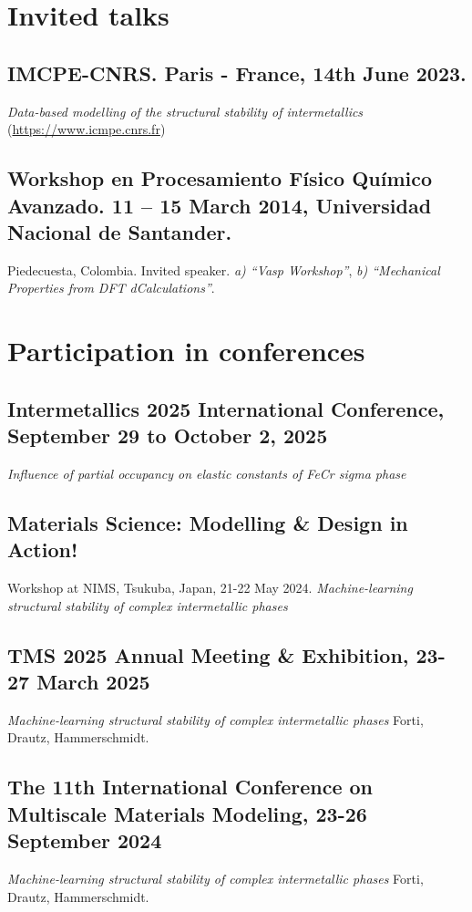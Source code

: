\section{Invited talks}

\subsection{IMCPE-CNRS. Paris - France, 14th June 2023.} 
\emph{Data-based modelling of the structural stability of intermetallics}
(\href{https://www.icmpe.cnrs.fr/agenda/seminaire-du-dr-mariano-forti/}{https://www.icmpe.cnrs.fr})

\subsection{ Workshop en Procesamiento Físico Químico Avanzado. 11 – 15 March
	2014, Universidad Nacional de Santander.} Piedecuesta, Colombia. Invited
speaker. \emph{ a) “Vasp Workshop”},\emph{ b) “Mechanical Properties from DFT dCalculations”}.


\section{Participation in conferences}


\subsection{Intermetallics 2025 International Conference, September 29 to October 2, 2025}
\emph{Influence of partial occupancy on elastic constants of FeCr sigma phase}

\subsection{Materials Science: Modelling \& Design in Action!}
Workshop at NIMS, Tsukuba, Japan, 21-22 May 2024.
\emph{Machine-learning structural stability of complex intermetallic phases}

\subsection{TMS 2025 Annual Meeting \& Exhibition, 23-27 March 2025}
\emph{Machine-learning structural stability of complex intermetallic phases}
Forti, Drautz, Hammerschmidt.

\subsection{The 11th International Conference on Multiscale Materials Modeling, 23-26 September 2024}
\emph{Machine-learning structural stability of complex intermetallic phases}
Forti, Drautz, Hammerschmidt.

